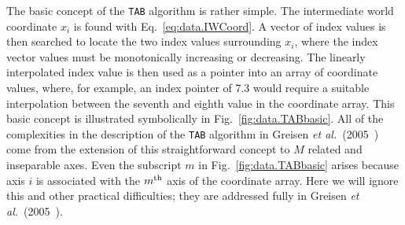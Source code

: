 \documentclass[twoside]{article}
\newcommand{\etal}{{\it et al.}}
\newcommand{\keyw}[1]{\hbox{{\tt #1}}}
\begin{document}
The basic concept of the \keyw{TAB} algorithm is rather simple.  The
intermediate world coordinate $x_i$ is found with
Eq.~\ref{eq:data.IWCoord}.  A vector of index values is then
searched to locate the two index values surrounding $x_i$, where the
index vector values must be monotonically increasing or decreasing.
The linearly interpolated index value is then used as a pointer into
an array of coordinate values, where, for example, an index pointer of
7.3 would require a suitable interpolation between the seventh and
eighth value in the coordinate array.  This basic concept is
illustrated symbolically in Fig.~\ref{fig:data.TABbasic}.  All of the
complexities in the description of the \keyw{TAB} algorithm in Greisen
\etal~(2005~\cite{GCVA05}) come from the extension of this
straightforward concept to $M$ related and inseparable axes.  Even the
subscript $m$ in Fig.~\ref{fig:data.TABbasic} arises because axis $i$
is associated  with the $m^{\rm th}$ axis of the coordinate array.
Here we will ignore this and other practical difficulties; they are
addressed fully in Greisen \etal~(2005~\cite{GCVA05}).
\end{document}
